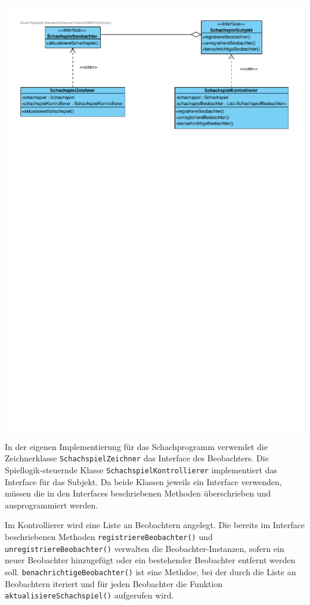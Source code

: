 \begin{minipage}{\linewidth}
    \centering
    \includegraphics[scale=0.75, trim={0 20cm 0 0}]{Bilder/SWE_mit_Observer.pdf}
\end{minipage}

In der eigenen Implementierung für das Schachprogramm verwendet die Zeichnerklasse \texttt{SchachspielZeichner} das Interface des Beobachters.
Die Spiellogik-steuernde Klasse \texttt{SchachspielKontrollierer} implementiert das Interface für das Subjekt. 
Da beide Klassen jeweils ein Interface verwenden, müssen die in den Interfaces beschriebenen Methoden überschrieben und ausprogrammiert werden. 

Im Kontrollierer wird eine Liste an Beobachtern angelegt.
Die bereits im Interface beschriebenen Methoden \texttt{registriereBeobachter()} und \texttt{unregistriereBeobachter()} verwalten die Beobachter-Instanzen, sofern ein neuer Beobachter hinzugefügt oder ein bestehender Beobachter entfernt werden soll. 
\texttt{benachrichtigeBeobachter()} ist eine Methdoe, bei der durch die Liste an Beobachtern iteriert und für jeden Beobachter die Funktion \texttt{aktualisiereSchachspiel()} aufgerufen wird.

